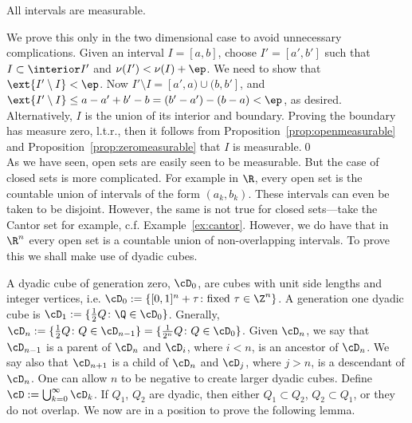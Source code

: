

\begin{prop}
All intervals are measurable.
\end{prop}

\pfsk We prove this only in the two dimensional case to avoid unnecessary complications. Given an interval $I=[a,b]$, choose $I'=[a',b']$ such that $I \subset \interior I'$ and $\nu(I')< \nu(I)+\ep$. We need to show that $\ext{I' \setminus I}<\ep$. Now $I' \setminus I=[a',a) \cup (b,b']$, and $\ext{I' \setminus I} \leq a-a'+b'-b= (b'-a') - (b-a)<\ep$, as desired. Alternatively, $I$ is the union of its interior and boundary. Proving the boundary has measure zero, l.t.r., then it follows from Proposition~\ref{prop:openmeasurable} and Proposition~\ref{prop:zeromeasurable} that $I$ is measurable.\qed \\


As we have seen, open sets are easily seen to be measurable. But the case of closed sets is more complicated. For example in $\R$, every open set is the countable union of intervals of the form $(a_k,b_k)$. These intervals can even be taken to be disjoint. However, the same is not true for closed sets---take the Cantor set for example, c.f. Example~\ref{ex:cantor}. However, we do have that in $\R^n$ every open set is a countable union of non-overlapping intervals. To prove this we shall make use of dyadic cubes.


A dyadic cube of generation zero, $\cD_0$, are cubes with unit side lengths and integer vertices, i.e. $\cD_0:=\{[0,1]^n + \tau \colon \text{fixed } \tau \in \Z^n\}$. A generation one dyadic cube is $\cD_1:= \{\frac{1}{2}Q \colon \Q \in \cD_0\}$. Gnerally, $\cD_n:= \{\frac{1}{2} Q \colon Q \in \cD_{n-1}\}=\{\frac{1}{2^n}Q \colon Q \in \cD_0\}$. Given $\cD_n$, we say that $\cD_{n-1}$ is a parent of $\cD_n$ and $\cD_i$, where $i<n$, is an ancestor of $\cD_n$. We say also that $\cD_{n+1}$ is a child of $\cD_n$ and $\cD_j$, where $j>n$, is a descendant of $\cD_n$. One can allow $n$ to be negative to create larger dyadic cubes. Define $\cD:= \bigcup_{k=0}^\infty \cD_k$. If $Q_1$, $Q_2$ are dyadic, then either $Q_1 \subset Q_2$, $Q_2 \subset Q_1$, or they do not overlap. We now are in a position to prove the following lemma. 


